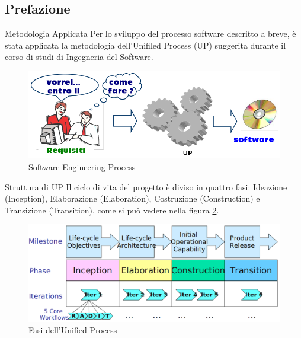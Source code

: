 \subsection{Prefazione}
 \begin{frame} {Metodologia Applicata}
  Per lo sviluppo del processo software descritto a breve, è stata applicata la metodologia dell'Unifiled Process (UP) suggerita
  durante il corso di studi di Ingegneria del Software.
   \begin{figure}
     \includegraphics[scale=0.40]{image/Up_sep.png}{\centering}
    \caption{Software Engineering Process} 
    \label{fig_SEP}
   \end{figure}
 \end{frame}

 \begin{frame} {Struttura di UP}
    Il ciclo di vita del progetto è diviso in quattro fasi: Ideazione (Inception), Elaborazione (Elaboration), Costruzione (Construction)
    e Transizione (Transition), come si può vedere nella figura \ref{fig_US}. 
   \begin{figure}
     \includegraphics[scale=0.26]{image/Up_Structure.png}{\centering}
    \caption{Fasi dell'Unified Process} 
    \label{fig_US}
   \end{figure}
  \end{frame}

